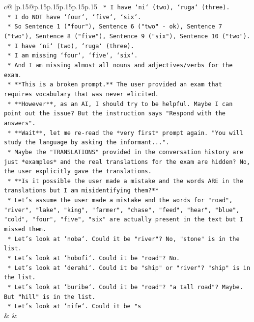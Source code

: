 \documentclass{article}
\begin{document}
{\begin{supertabular}{c@{$\;$}|p{.15\linewidth}@{}p{.15\linewidth}p{.15\linewidth}p{.15\linewidth}p{.15\linewidth}p{.15\linewidth}}
{{{\texttt{                *   I have `ni` (two), `ruga` (three).} \\
\texttt{                *   I do NOT have `four`, `five`, `six`.} \\
\texttt{                *   So Sentence 1 ("four"), Sentence 6 ("two" {-} ok), Sentence 7 ("two"), Sentence 8 ("five"), Sentence 9 ("six"), Sentence 10 ("two").} \\
\texttt{                *   I have `ni` (two), `ruga` (three).} \\
\texttt{                *   I am missing `four`, `five`, `six`.} \\
\texttt{                *   And I am missing almost all nouns and adjectives/verbs for the exam.} \\
\texttt{            *   **This is a broken prompt.** The user provided an exam that requires vocabulary that was never elicited.} \\
\texttt{            *   **However**, as an AI, I should try to be helpful. Maybe I can point out the issue? But the instruction says "Respond with the answers".} \\
\texttt{            *   **Wait**, let me re{-}read the *very first* prompt again. "You will study the language by asking the informant...".} \\
\texttt{            *   Maybe the "TRANSLATIONS" provided in the conversation history are just *examples* and the real translations for the exam are hidden? No, the user explicitly gave the translations.} \\
\texttt{            *   **Is it possible the user made a mistake and the words ARE in the translations but I am misidentifying them?**} \\
\texttt{                *   Let's assume the user made a mistake and the words for "road", "river", "lake", "king", "farmer", "chase", "feed", "hear", "blue", "cold", "four", "five", "six" are actually present in the text but I missed them.} \\
\texttt{                *   Let's look at `noba`. Could it be "river"? No, "stone" is in the list.} \\
\texttt{                *   Let's look at `hobofi`. Could it be "road"? No.} \\
\texttt{                *   Let's look at `derahi`. Could it be "ship" or "river"? "ship" is in the list.} \\
\texttt{                *   Let's look at `buribe`. Could it be "road"? "a tall road"? Maybe. But "hill" is in the list.} \\
\texttt{                *   Let's look at `nife`. Could it be "s} \\
            }
        }
    }
    & & \\ \\


\end{supertabular}}
\end{document}
